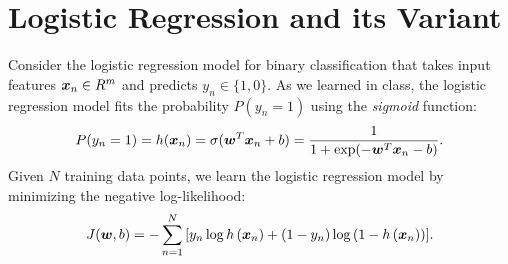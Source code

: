 \documentclass[11pt]{article}
\begin{document}
\section{Logistic Regression and its Variant }

Consider the logistic regression model for binary classification that takes input features $\boldsymbol{x}_n\in R^m$ and predicts $y_n \in \{1,0\}$. 
As we learned in class, the logistic regression model fits the probability $P(y_n = 1)$ using the \textit{sigmoid} function:
\begin{equation}
    P(y_n = 1) = h(\boldsymbol{x}_n) = \sigma(\boldsymbol{w}^T \boldsymbol{x}_n+b) = \frac{1}{1+ \exp(-\boldsymbol{w}^T\boldsymbol{x}_n-b)}.
\end{equation}
Given $N$ training data points, we learn the logistic regression model by minimizing the negative log-likelihood:
\begin{equation}
\label{eq:j}
J(\boldsymbol{w}, b) = 
  -  \sum_{n=1}^{N}{
  \left[ y_{n} \log h\left(\boldsymbol{x}_{n}\right) 
  + \left(1 - y_{n}\right) \log \left(1 - h\left(\boldsymbol{x}_{n}\right)\right) \right]}.
\end{equation}
\end{document}
